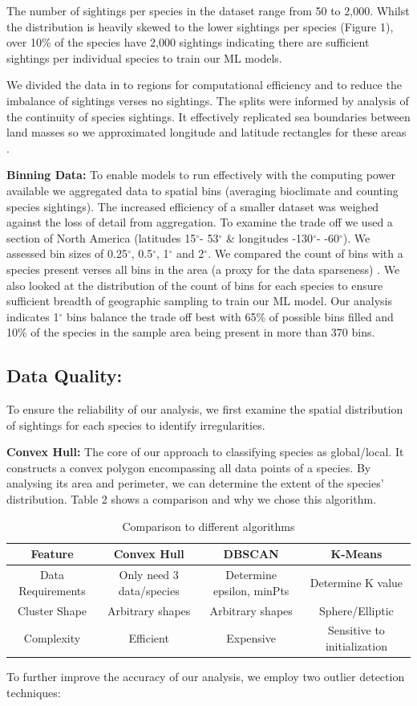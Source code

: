 \documentclass{article}
\begin{document}
The  number of sightings per species in the dataset range from 50 to 2,000.  Whilst the distribution is heavily skewed to the lower sightings per species (Figure 1), over 10\% of the species have 2,000 sightings indicating there are sufficient sightings per individual species to train our ML models. 

We divided the data in to regions for computational efficiency and to reduce the imbalance of sightings verses no sightings.  The splits were informed by analysis of the continuity of species sightings.  It effectively replicated sea boundaries between land masses so we approximated longitude and latitude rectangles for these areas .  

\textbf{Binning Data:} To enable models to run effectively with the computing power available we aggregated data to spatial bins (averaging bioclimate and counting species sightings).  The increased efficiency of a smaller dataset was weighed against the loss of detail from aggregation.  To examine the trade off we used a section of North America (latitudes 15$^{\circ}$- 53$^{\circ}$ \& longitudes -130$^{\circ}$- -60$^{\circ}$).  We assessed bin sizes of 0.25$^{\circ}$, 0.5$^{\circ}$, 1$^{\circ}$ and 2$^{\circ}$. We compared the count of bins with a species present verses all bins in the area (a proxy for the data sparseness) .  We also looked at the distribution of the count of bins for each species to ensure sufficient breadth of geographic sampling to train our ML model.   Our analysis indicates 1$^{\circ}$ bins balance the trade off best with 65\% of possible bins filled and 10\% of the species in the sample area being present in more than 370 bins.   

\subsection{Data Quality: }
To ensure the reliability of our analysis, we first examine the spatial distribution of sightings for each species to identify irregularities.  

\textbf{Convex Hull:} The core of our approach to classifying species as global/local. It constructs a convex polygon encompassing all data points of a species. By analysing its area and perimeter, we can determine the extent of the species' distribution. Table 2 shows a comparison and why we chose this algorithm.
\begin{table}[h]
    \centering    
    \begin{tabular}{|c|c|c|c|} \hline 
 Feature& Convex Hull& DBSCAN& K-Means\\ \hline 
 Data Requirements& Only need 3 data/species& Determine epsilon, minPts&Determine K value\\ \hline 
         Cluster Shape&  Arbitrary shapes&  Arbitrary shapes&  Sphere/Elliptic\\ \hline 
         Complexity&  Efficient&  Expensive&  Sensitive to initialization\\ \hline
    \end{tabular}
\caption{Comparison to different algorithms}
\label{tab:Comparison to different algorithms}  
\end{table}
To further improve the accuracy of our analysis, we employ two outlier detection techniques:
\end{document}
